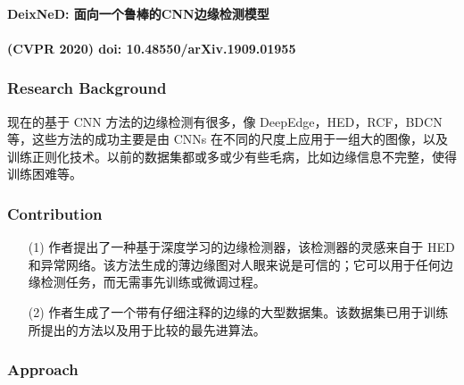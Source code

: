 \documentclass[a4paper, 10pt]{article}
\begin{document}
		\paragraph{DeixNeD: 面向一个鲁棒的CNN边缘检测模型}
		
		\paragraph{(CVPR 2020) doi: 10.48550/arXiv.1909.01955}
		
			\subsubsection{Research Background}
		
			现在的基于 CNN 方法的边缘检测有很多，像 DeepEdge，HED，RCF，BDCN 等，这些方法的成功主要是由 CNNs 在不同的尺度上应用于一组大的图像，以及训练正则化技术。以前的数据集都或多或少有些毛病，比如边缘信息不完整，使得训练困难等。
		
			\subsubsection{Contribution}
		
			\begin{itemize}
			\item[(1)]
			作者提出了一种基于深度学习的边缘检测器，该检测器的灵感来自于 HED 和异常网络。该方法生成的薄边缘图对人眼来说是可信的；它可以用于任何边缘检测任务，而无需事先训练或微调过程。
			
			\item[(2)]
			作者生成了一个带有仔细注释的边缘的大型数据集。该数据集已用于训练所提出的方法以及用于比较的最先进算法。
			\end{itemize}
		
			\subsubsection{Approach}
		
\end{document}
